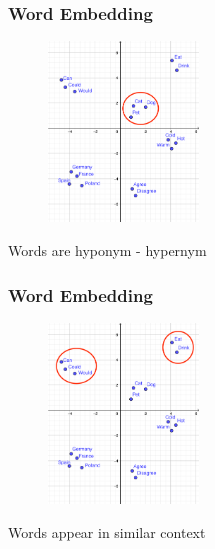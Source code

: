 

\begin{frame}
	\frametitle{Word Embedding}

	\begin{figure}
		\includegraphics[width=4cm]{./figures/Group_hyponym}
	\end{figure}
		\begin{center}
		{Words are hyponym - hypernym}
		\end{center}
	\vspace{-0.5cm}

\end{frame}



\begin{frame}
	\frametitle{Word Embedding}

	\begin{figure}
		\includegraphics[width=4cm]{./figures/Group_context}
	\end{figure}
		\begin{center}
		{Words appear in similar context}
		\end{center}
	\vspace{-0.5cm}

\end{frame}

